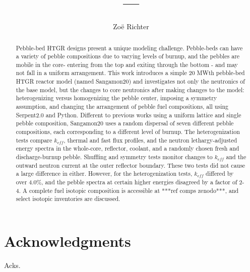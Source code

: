 \documentclass[edeposit,fullpage]{uiucthesis2018}
\title{---}
\author{Zo{\"e} Richter}
\begin{document}
\maketitle

\frontmatter
\begin{abstract}
Pebble-bed HTGR designs present a unique modeling challenge.  Pebble-beds can have a variety of pebble compositions due to varying levels of burnup, and the pebbles are mobile in the core- entering from the top and exiting through the bottom - and may not fall in a uniform arrangement.  This work introduces a simple 20 MWth pebble-bed HTGR reactor model (named Sangamon20) and investigates not only the neutronics of the base model, but the changes to core neutronics after making changes to the model: heterogenizing versus homogenizing the pebble center, imposing a symmetry assumption, and changing the arrangement of pebble fuel compositions, all using Serpent2.0 and Python.  Different to previous works using a uniform lattice and single pebble composition, Sangamon20 uses a random dispersal of seven different pebble compositions, each corresponding to a different level of burnup.  The heterogenization tests compare $k_{eff}$, thermal and fast flux profiles, and the neutron lethargy-adjusted energy spectra in the whole-core, reflector, coolant, and a randomly chosen fresh and discharge-burnup pebble.  Shuffling and symmetry tests monitor changes to $k_{eff}$ and the outward neutron current at the outer reflector boundary.  These two tests did not cause a large difference in either.  However, for the heterogenization tests, $k_{eff}$ differed by over 4.0\%, and the pebble spectra at certain higher energies disagreed by a factor of 2-4.  A complete fuel isotopic composition is accessible at ***ref comps zenodo***, and select isotopic inventories are discussed.

\end{abstract}

\chapter*{Acknowledgments}

Acks.

\end{document}

